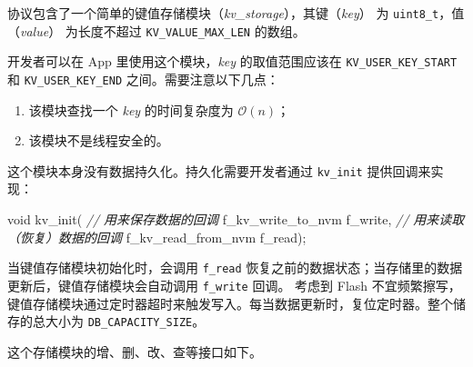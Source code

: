 \documentclass[
  12pt,
]{book}
\newenvironment{Shaded}{\begin{snugshade}}{\end{snugshade}}
\newcommand{\CommentTok}[1]{\textcolor[rgb]{0.56,0.35,0.01}{\textit{#1}}}
\newcommand{\DataTypeTok}[1]{\textcolor[rgb]{0.13,0.29,0.53}{#1}}
\newcommand{\NormalTok}[1]{#1}
\providecommand{\tightlist}{%
  \setlength{\itemsep}{0pt}\setlength{\parskip}{0pt}}
\begin{document}
协议包含了一个简单的键值存储模块（\emph{kv\_storage}），其键（\emph{key}） 为 \texttt{uint8\_t}，值（\emph{value}） 为长度不超过 \texttt{KV\_VALUE\_MAX\_LEN}
的数组。

开发者可以在 App 里使用这个模块，\emph{key} 的取值范围应该在 \texttt{KV\_USER\_KEY\_START} 和 \texttt{KV\_USER\_KEY\_END} 之间。需要注意以下几点：

\begin{enumerate}
\def\labelenumi{\arabic{enumi}.}
\tightlist
\item
  该模块查找一个 \emph{key} 的时间复杂度为 \(\mathcal{O}(n)\)；
\item
  该模块不是线程安全的。
\end{enumerate}

这个模块本身没有数据持久化。持久化需要开发者通过 \texttt{kv\_init} 提供回调来实现：

\begin{Shaded}
\begin{Highlighting}[]
\DataTypeTok{void}\NormalTok{ kv_init(}
  \CommentTok{// 用来保存数据的回调}
\NormalTok{  f_kv_write_to_nvm f_write,}
  \CommentTok{// 用来读取（恢复）数据的回调}
\NormalTok{  f_kv_read_from_nvm f_read);}
\end{Highlighting}
\end{Shaded}

当键值存储模块初始化时，会调用 \texttt{f\_read} 恢复之前的数据状态；当存储里的数据更新后，键值存储模块会自动调用 \texttt{f\_write} 回调。
考虑到 Flash 不宜频繁擦写，键值存储模块通过定时器超时来触发写入。每当数据更新时，复位定时器。整个储存的总大小为
\texttt{DB\_CAPACITY\_SIZE}。

这个存储模块的增、删、改、查等接口如下。
\end{document}
